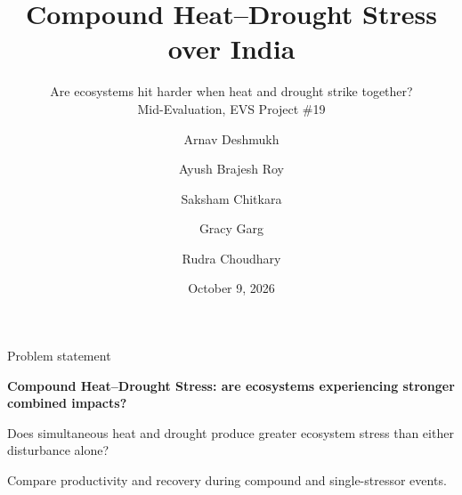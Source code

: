 \documentclass[aspectratio=169,xcolor=table]{beamer}
\title[Compound Heat--Drought Stress]{Compound Heat--Drought Stress over India}
\subtitle{Are ecosystems hit harder when heat and drought strike together?\\[2pt] Mid-Evaluation, EVS Project \#19}
\author{Arnav Deshmukh \and Ayush Brajesh Roy \and Saksham Chitkara \and Gracy Garg \and Rudra Choudhary}
\institute{IIIT Hyderabad}
\date{October 9, 2026}
\begin{document}
\begin{frame}
  \titlepage
\end{frame}

\begin{frame}{Problem statement}
    \begin{center}
        \Large \textbf{Compound Heat--Drought Stress: are ecosystems experiencing stronger combined impacts?}
        
        \vspace{1em}
        
        \large Does simultaneous heat and drought produce greater ecosystem stress than either disturbance alone?
        
        \vspace{1em}
        
        \normalsize Compare productivity and recovery during compound and single-stressor events.
    \end{center}
\end{frame}
\end{document}

